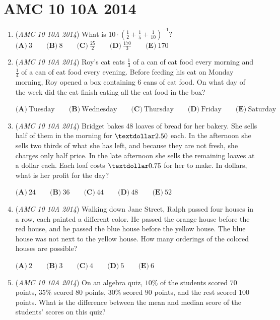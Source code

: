 \section{AMC 10 10A 2014}
        \begin{enumerate}
        	\item (\textit{AMC 10 10A 2014}) What is $10 \cdot \left(\frac{1}{2} + \frac{1}{5} + \frac{1}{10}\right)^{-1}?$
$\textbf{(A)}\ 3\qquad\textbf{(B)}\ 8\qquad\textbf{(C)}\ \frac{25}{2}\qquad\textbf{(D)}\ \frac{170}{3}\qquad\textbf{(E)}\ 170$


	\item (\textit{AMC 10 10A 2014}) Roy's cat eats $\frac{1}{3}$ of a can of cat food every morning and $\frac{1}{4}$ of a can of cat food every evening. Before feeding his cat on Monday morning, Roy opened a box containing $6$ cans of cat food. On what day of the week did the cat finish eating all the cat food in the box?


 $\textbf{(A)}\ \text{Tuesday}\qquad\textbf{(B)}\ \text{Wednesday}\qquad\textbf{(C)}\ \text{Thursday}\qquad\textbf{(D)}\ \text{Friday}\qquad\textbf{(E)}\ \text{Saturday}$


	\item (\textit{AMC 10 10A 2014}) Bridget bakes 48 loaves of bread for her bakery. She sells half of them in the morning for $\textdollar 2.50$ each. In the afternoon she sells two thirds of what she has left, and because they are not fresh, she charges only half price. In the late afternoon she sells the remaining loaves at a dollar each. Each loaf costs $\textdollar 0.75$ for her to make. In dollars, what is her profit for the day?


 $\textbf{(A)}\ 24\qquad\textbf{(B)}\ 36\qquad\textbf{(C)}\ 44\qquad\textbf{(D)}\ 48\qquad\textbf{(E)}\ 52$


	\item (\textit{AMC 10 10A 2014}) Walking down Jane Street, Ralph passed four houses in a row, each painted a different color. He passed the orange house before the red house, and he passed the blue house before the yellow house. The blue house was not next to the yellow house. How many orderings of the colored houses are possible?


 $\textbf{(A)}\ 2\qquad\textbf{(B)}\ 3\qquad\textbf{(C)}\ 4\qquad\textbf{(D)}\ 5\qquad\textbf{(E)}\ 6$


	\item (\textit{AMC 10 10A 2014}) On an algebra quiz, $10\%$ of the students scored $70$ points, $35\%$ scored $80$ points, $30\%$ scored $90$ points, and the rest scored $100$ points. What is the difference between the mean and median score of the students' scores on this quiz?



\end{enumerate}

